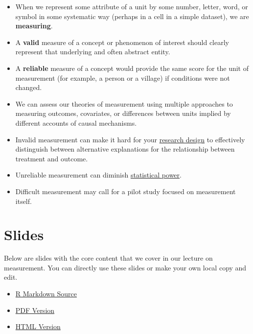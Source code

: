 \documentclass[12pt,]{book}
\begin{document}
\begin{itemize}
\item
  When we represent some attribute of a unit by some number, letter, word, or symbol in some systematic way (perhaps in a cell in a simple dataset), we are \textbf{measuring}.
\item
  A \textbf{valid} measure of a concept or phenomenon of interest should clearly
  represent that underlying and often abstract entity.
\item
  A \textbf{reliable} measure of a concept would provide the same score for the
  unit of measurement (for example, a person or a village) if conditions were not changed.
\item
  We can assess our theories of measurement using multiple approaches to measuring outcomes, covariates, or differences between units implied by different accounts of causal mechanisms.
\item
  Invalid measurement can make it hard for your \href{https://egap.github.io/learningdays-resources/Exercises/design-form.Rmd}{research design} to effectively distinguish between alternative explanations for the relationship between treatment and outcome.
\item
  Unreliable measurement can diminish \href{statistical-power-and-design-diagnosands.html}{statistical power}.
\item
  Difficult measurement may call for a pilot study focused on measurement itself.
\end{itemize}

\hypertarget{slides-6}{%
\section{Slides}\label{slides-6}}

Below are slides with the core content that we cover in our lecture on measurement. You can directly use these slides or make your own local copy and edit.

\begin{itemize}
\item
  \href{https://egap.github.io/learningdays-resources/Slides/measurement-slides.Rmd}{R Markdown Source}
\item
  \href{https://egap.github.io/learningdays-resources/Slides/measurement-slides.pdf}{PDF Version}
\item
  \href{https://egap.github.io/learningdays-resources/Slides/measurement-slides.html}{HTML Version}
\end{itemize}
\end{document}
